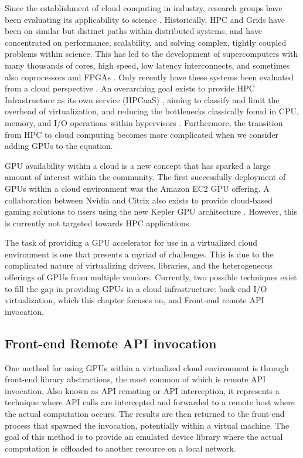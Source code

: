 Since the establishment of cloud computing in industry, research groups have been evaluating its applicability to science \cite{foster2008cca}. Historically, HPC and Grids have been on similar but distinct paths within distributed systems, and have concentrated on performance, scalability, and solving complex, tightly coupled problems within science. This has led to the development of supercomputers with many thousands of cores, high speed, low latency interconnects, and sometimes also coprocessors and FPGAs \cite{barker2008entering, craven2007examining}.  Only recently have these systems been evaluated from a cloud perspective \cite{MagellanFinal}.  An overarching goal exists to provide HPC Infrastructure as its own service (HPCaaS) \cite{shainer2009scheduling}, aiming to classify and limit the overhead of virtualization, and reducing the bottlenecks classically found in CPU, memory, and  I/O operations within hypervisors \cite{Younge2011cloud, jackson2010performance}. Furthermore, the transition from HPC to cloud computing becomes more complicated when we consider adding GPUs to the equation.


GPU availability within a cloud is a new concept that has sparked a large amount of interest within the community.  The first successfully deployment of GPUs within a cloud environment was the Amazon EC2 GPU offering.  A collaboration between Nvidia and Citrix also exists to provide cloud-based gaming solutions to users using the new Kepler GPU architecture \cite{www-nvidiacitrix}. However, this is currently not targeted towards HPC applications. 

The task of providing a GPU accelerator for use in a virtualized cloud environment is one that presents a myriad of challenges.  This is due to the complicated nature of virtualizing drivers, libraries, and the heterogeneous offerings of GPUs from multiple vendors. Currently, two possible techniques exist to fill the gap in providing GPUs in a cloud infrastructure: back-end I/O virtualization, which this chapter focuses on, and Front-end remote API invocation.

\subsection{Front-end Remote API invocation}

One method for using GPUs within a virtualized cloud environment is through front-end library abstractions, the most common of which is remote API invocation.  Also known as API remoting or API interception, it represents a technique where API calls are intercepted and forwarded to a remote host where the actual computation occurs.  The results are then returned to the front-end process that spawned the invocation, potentially within a virtual machine.  The goal of this method is to provide an emulated device library where the actual computation is offloaded to another resource on a local network. 

